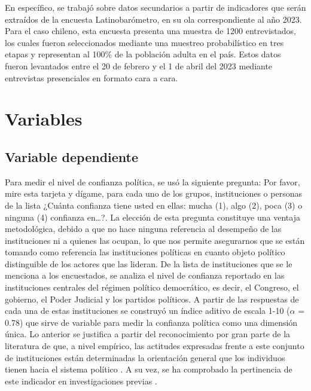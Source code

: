 \documentclass[12pt,twoside]{templates/facsothesis}
\begin{document}
En específico, se trabajó sobre datos secundarios a partir de indicadores que serán extraídos de la encuesta Latinobarómetro, en su ola correspondiente al año 2023. Para el caso chileno, esta encuesta presenta una muestra de 1200 entrevistados, los cuales fueron seleccionados mediante una muestreo probabilístico en tres etapas y representan al 100\% de la población adulta en el país. Estos datos fueron levantados entre el 20 de febrero y el 1 de abril del 2023 mediante entrevistas presenciales en formato cara a cara.

\section{Variables}\label{variables}

\subsection{Variable dependiente}\label{variable-dependiente}

Para medir el nivel de confianza política, se usó la siguiente pregunta: Por favor, mire esta tarjeta y dígame, para cada uno de los grupos, instituciones o personas de la lista ¿Cuánta confianza tiene usted en ellas: mucha (1), algo (2), poca (3) o ninguna (4) confianza en\ldots?. La elección de esta pregunta constituye una ventaja metodológica, debido a que no hace ninguna referencia al desempeño de las instituciones ni a quienes las ocupan, lo que nos permite asegurarnos que se están tomando como referencia las instituciones políticas en cuanto objeto político distinguible de los actores que las lideran. De la lista de instituciones que se le menciona a los encuestados, se analiza el nivel de confianza reportado en las instituciones centrales del régimen político democrático, es decir, el Congreso, el gobierno, el Poder Judicial y los partidos políticos. A partir de las respuestas de cada una de estas instituciones se construyó un índice aditivo de escala 1-10 (\(\alpha\) = 0.78) que sirve de variable para medir la confianza política como una dimensión única. Lo anterior se justifica a partir del reconocimiento por gran parte de la literatura de que, a nivel empírico, las actitudes expresadas frente a este conjunto de instituciones están determinadas la orientación general que los individuos tienen hacia el sistema político \citep{marienMeasuringPoliticalTrust2013, zmerliPoliticalTrust2022}. A su vez, se ha comprobado la pertinencia de este indicador en investigaciones previas \citep{bargstedSocialPoliticalTrust2023, zmerliIncomeInequalityDistributive2015}.
\end{document}
